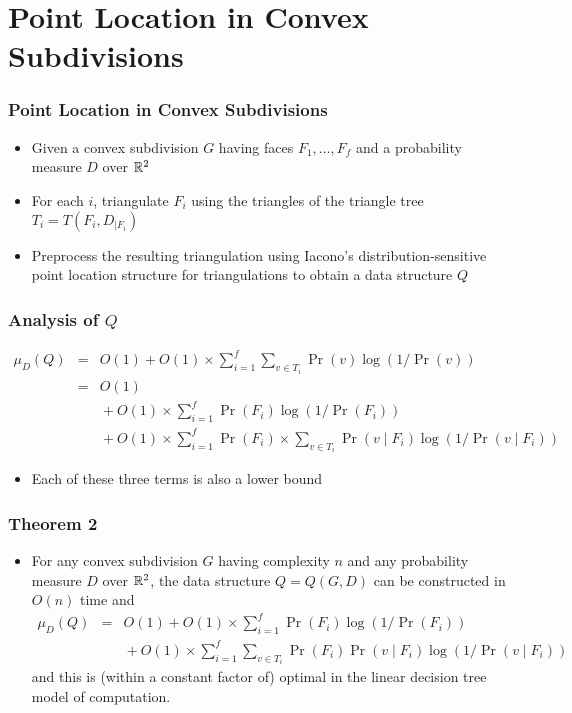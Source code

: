 \documentclass{beamer}
\begin{document}
\section{Point Location in Convex Subdivisions}
\frame
{
	\frametitle{Point Location in Convex Subdivisions}

	\begin{itemize}
	\item<1-> Given a convex subdivision $G$ having faces
$F_1,\ldots,F_f$ and a probability measure $D$ over $\mathbb{R}^2$

	\item<2-> For each $i$, triangulate $F_i$ using the triangles of
the triangle tree $T_i=T(F_i,D_{\mid F_i})$

	\item<3-> Preprocess the resulting triangulation using Iacono's
distribution-sensitive point location structure for triangulations to
obtain a data structure $Q$

	\end{itemize}
}

\frame
{
	\frametitle{Analysis of $Q$}

	\begin{eqnarray*}
	\mu_D(Q) & = & O(1)+O(1)\times\sum_{i=1}^f\sum_{v\in
T_i}\Pr(v)\log(1/\Pr(v)) \\
	         & = & O(1) \\ & & {}+O(1)\times\sum_{i=1}^f\Pr(F_i)\log
(1/\Pr(F_i)) \\ & & {}+ O(1)\times\sum_{i=1}^f\Pr(F_i)\times\sum_{v\in T_i}\Pr(v\mid
F_i)\log(1/\Pr(v\mid F_i))
	\end{eqnarray*}
	\begin{itemize}
	\item<2->Each of these three terms is also a lower bound
	\end{itemize}
}

\frame
{
	\frametitle{Theorem 2}

	\begin{itemize}
	\item For any convex subdivision $G$ having complexity $n$ and
	any probability measure $D$ over $\mathbb{R}^2$, the data structure
$Q=Q(G,D)$ can be constructed in $O(n)$ time and 
	\begin{eqnarray*}
	\mu_D(Q) 
         & = & O(1)+O(1)\times\sum_{i=1}^f\Pr(F_i)\log
(1/\Pr(F_i)) \\ & & {}+ O(1)\times\sum_{i=1}^f\sum_{v\in T_i}\Pr(F_i)\Pr(v\mid
F_i)\log(1/\Pr(v\mid F_i))
	\end{eqnarray*}
	and this is (within a constant factor of) optimal in the linear decision tree model of
computation.
	\end{itemize}
}
\end{document}
